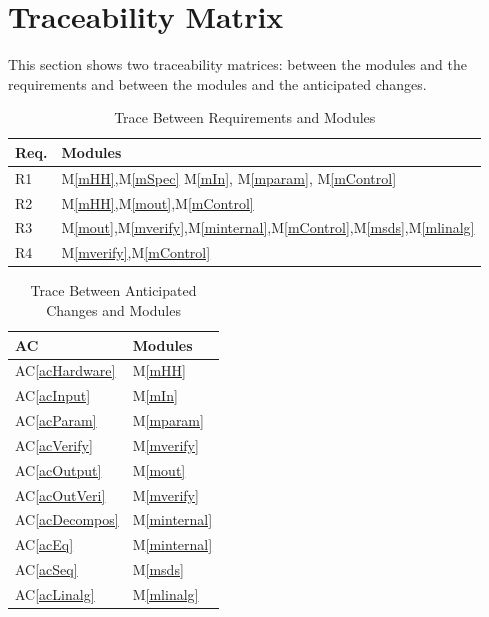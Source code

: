 \documentclass[12pt, titlepage]{article}
\newcommand{\acref}[1]{AC\ref{#1}}
\newcommand{\mref}[1]{M\ref{#1}}
\begin{document}
\section{Traceability Matrix} \label{SecTM}

This section shows two traceability matrices: between the modules and the
requirements and between the modules and the anticipated changes.

\begin{table}[H]
\centering
\begin{tabular}{p{} p{}}
\toprule
\textbf{Req.} & \textbf{Modules}\\
\midrule
R1 & \mref{mHH},\mref{mSpec} \mref{mIn}, \mref{mparam}, \mref{mControl}\\
R2 & \mref{mHH},\mref{mout},\mref{mControl}\\
R3 & \mref{mout},\mref{mverify},\mref{minternal},\mref{mControl},\mref{msds},\mref{mlinalg}\\
R4 & \mref{mverify},\mref{mControl} \\

\bottomrule
\end{tabular}
\caption{Trace Between Requirements and Modules}
\label{TblRT}
\end{table}

\begin{table}[H]
\centering
\begin{tabular}{p{} p{}}
\toprule
\textbf{AC} & \textbf{Modules}\\
\midrule
\acref{acHardware} & \mref{mHH}\\
\acref{acInput} & \mref{mIn}\\
\acref{acParam} & \mref{mparam}\\
\acref{acVerify} & \mref{mverify}\\
\acref{acOutput} & \mref{mout}\\
\acref{acOutVeri} & \mref{mverify}\\
\acref{acDecompos} & \mref{minternal}\\
\acref{acEq} &\mref{minternal}\\
\acref{acSeq} & \mref{msds}\\
\acref{acLinalg} & \mref{mlinalg}\\
\bottomrule
\end{tabular}
\caption{Trace Between Anticipated Changes and Modules}
\label{TblACT}
\end{table}
\end{document}
